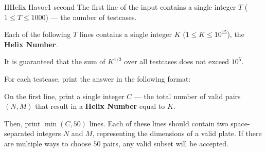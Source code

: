\begin{problem}{H}{Helix Havoc}{1 second}
\noindent
The first line of the input contains a single integer $T$ ($1 \le T \le 1000$) --- the number of testcases.

\noindent
Each of the following $T$ lines contains a single integer $K$ ($1 \le K \le 10^{15}$), the \textbf{Helix Number}.

\noindent
It is guaranteed that the sum of $K^{1/3}$ over all testcases does not exceed $10^5$.

\OutputFile

\noindent
For each testcase, print the answer in the following format:

\noindent
On the first line, print a single integer $C$ --- the total number of valid pairs $(N, M)$ that result in a \textbf{Helix Number} equal to $K$.

\noindent
Then, print $\min(C, 50)$ lines. Each of these lines should contain two space-separated integers $N$ and $M$, representing the dimensions of a valid plate. If there are multiple ways to choose $50$ pairs, any valid subset will be accepted.

\Examples

\begin{example}
\end{example}

\pagebreak

\end{problem}